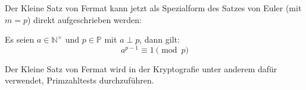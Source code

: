 \noindent
Der Kleine Satz von Fermat kann jetzt als Spezialform des Satzes von Euler (mit $m = p$) direkt
aufgeschrieben werden:

\begin{satz}
  \label{satz:kleiner-fermat}
  Es seien $a \in \mathbb{N}^\times$ und $p \in \mathbb{P}$ mit $a \perp p$, dann gilt:
  \begin{equation*}
    a^{p-1} \equiv 1 \pmod{p}
  \end{equation*}
\end{satz}

\noindent
Der Kleine Satz von Fermat wird in der Kryptografie unter anderem dafür verwendet,
Primzahltests durchzuführen.